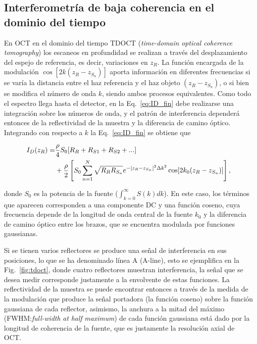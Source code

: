 \subsection{Interferometría de baja coherencia en el dominio del tiempo}



En OCT en el dominio del tiempo TDOCT (\textit{time-domain optical coherence tomography}) los escaneos en profundidad se realizan a través del desplazamiento del espejo de referencia, es decir, variaciones en $z_R$. La función encargada de la modulación $\cos[2k(z_R - z_{S_n})]$ aporta información en diferentes frecuencias si se varía la distancia entre el haz referencia y el haz objeto $(z_R - z_{S_n})$, o si bien se modifica el número de onda $k$, siendo ambos procesos equivalentes. Como todo el espectro llega hasta el detector, en la Eq.~\ref{eq:ID_fin} debe realizarse una integración sobre los números de onda, y el patrón de interferencia dependerá entonces de la reflectividad de la muestra y la diferencia de camino óptico. Integrando con respecto a $k$ la Eq.~\ref{eq:ID_fin} se obtiene que

\begin{align}
I_D(z_R) = &\frac{\rho}{4}S_0 [R_R+ R_{S1}+ R_{S2}+...]\\ \notag
&+\frac{\rho}{2}\left[ S_0 \sum_{n=1}^{N} \sqrt{R_R R_{S_n}} e^{-[z_R-z_{S_n}]^2 \Delta k^2}  \cos[2k_0 (z_R-z_{S_n})]\right],
\end{align}

\noindent donde $S_0$ es la potencia de la fuente ($\int_{k=0}^{\infty}S(k)dk$). En este caso, los términos que aparecen corresponden a una componente DC y una función coseno, cuya frecuencia depende de la longitud de onda central de la fuente $k_0$ y la diferencia de camino óptico entre los brazos, que se encuentra modulada por funciones gaussianas. 

Si se tienen varios reflectores se produce una señal de interferencia en sus posiciones, lo que se ha denominado línea A (A-line), esto se ejemplifica en la Fig.~\ref{fig:tdoct}, donde cuatro reflectores muestran interferencia, la señal que se desea medir corresponde justamente a la envolvente de estas funciones. La reflectividad de la muestra se puede encontrar entonces a través de la medida de la modulación que produce la señal portadora (la función coseno) sobre la función gaussiana de cada reflector, asimismo, la anchura a la mitad del máximo (FWHM:\textit{full-width at half maximum}) de cada función gaussiana está dado por la longitud de coherencia de la fuente, que es justamente la resolución axial de OCT.

